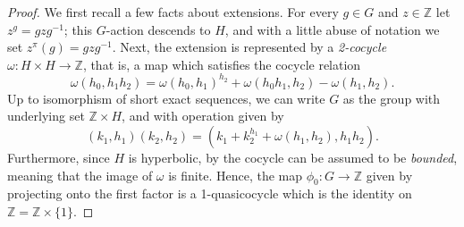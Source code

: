 \documentclass[svgnames]{amsart}
\theoremstyle{plain}
\theoremstyle{definition}
\newcommand{\Z}{\mathbb{Z}}
\begin{document}
\begin{proof} 
We first recall a few facts about extensions. For every $g\in G$ and $z\in \Z$ let $z^g=gzg^{-1}$; this $G$-action descends to $H$, and with a little abuse of notation we set $z^\pi(g)=gzg^{-1}$. Next, the extension is represented by a \emph{2-cocycle} $\omega\colon H\times H\to \Z$, that is, a map which satisfies the cocycle relation
$$\omega(h_0,h_1h_2) = \omega(h_0, h_1)^{h_2} + \omega(h_0h_1, h_2) - \omega(h_1, h_2).$$
Up to isomorphism of short exact sequences, we can write $G$ as the group with underlying set $\Z\times H$, and with operation given by
$$(k_1,h_1)(k_2,h_2)=(k_1+k_2^{h_1}+\omega(h_1,h_2), h_1h_2).$$
Furthermore, since $H$ is hyperbolic, by \cite[Theorem 3.1]{neumannreeves} the cocycle can be assumed to be \emph{bounded}, meaning that the image of $\omega$ is finite. Hence, the map $\phi_0\colon G\to \Z$ given by projecting onto the first factor is a 1-quasicocycle which is the identity on $\Z=\Z\times\{1\}$.


\end{proof}
\end{document}
